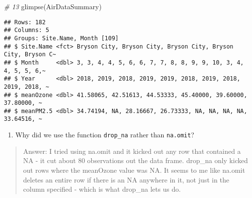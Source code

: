 \documentclass[
]{article}
\newenvironment{Shaded}{\begin{snugshade}}{\end{snugshade}}
\newcommand{\CommentTok}[1]{\textcolor[rgb]{0.56,0.35,0.01}{\textit{#1}}}
\newcommand{\FunctionTok}[1]{\textcolor[rgb]{0.00,0.00,0.00}{#1}}
\newcommand{\NormalTok}[1]{#1}
\providecommand{\tightlist}{%
  \setlength{\itemsep}{0pt}\setlength{\parskip}{0pt}}
\begin{document}
\begin{Shaded}
\begin{Highlighting}[]
\CommentTok{\# 13}
\FunctionTok{glimpse}\NormalTok{(AirDataSummary)}
\end{Highlighting}
\end{Shaded}

\begin{verbatim}
## Rows: 182
## Columns: 5
## Groups: Site.Name, Month [109]
## $ Site.Name <fct> Bryson City, Bryson City, Bryson City, Bryson City, Bryson C~
## $ Month     <dbl> 3, 3, 4, 4, 5, 6, 6, 7, 7, 8, 8, 9, 9, 10, 3, 4, 4, 5, 5, 6,~
## $ Year      <dbl> 2018, 2019, 2018, 2019, 2019, 2018, 2019, 2018, 2019, 2018, ~
## $ meanOzone <dbl> 41.58065, 42.51613, 44.53333, 45.40000, 39.60000, 37.80000, ~
## $ meanPM2.5 <dbl> 34.74194, NA, 28.16667, 26.73333, NA, NA, NA, NA, 33.64516, ~
\end{verbatim}

\begin{enumerate}
\def\labelenumi{\arabic{enumi}.}
\setcounter{enumi}{13}
\tightlist
\item
  Why did we use the function \texttt{drop\_na} rather than
  \texttt{na.omit}?
\end{enumerate}

\begin{quote}
Answer: I tried using na.omit and it kicked out any row that contained a
NA - it cut about 80 observations out the data frame. drop\_na only
kicked out rows where the meanOzone value was NA. It seems to me like
na.omit deletes an entire row if there is an NA anywhere in it, not just
in the column specified - which is what drop\_na lets us do.
\end{quote}
\end{document}
